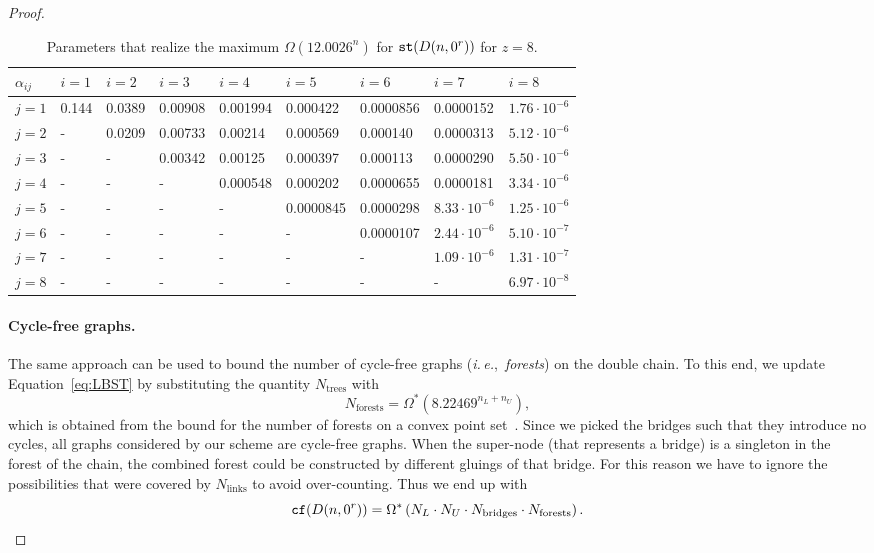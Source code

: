 \documentclass[11pt]{article}
\def\ie{{\it i.\,e.},~}
\def\st{{\tt st}}
\def\cf{{\tt cf}}
\begin{document}
\begin{proof}
\begin{table}
\centering
\begin{tabular}{l||llllllll}
 $\alpha_{ij}$ & $i=1$ & $i=2$ & $i=3$ & $i=4$ & $i=5$ & $i=6$ & $i=7$ & $i=8$ \\
  \hline
\hline
 $j=1$ & 0.144 & 0.0389 & 0.00908 & 0.001994 & 0.000422 & 0.0000856 & 0.0000152 & $1.76\cdot 10^{-6}$ \\
 $j=2$ & - & 0.0209 & 0.00733 & 0.00214 & 0.000569 & 0.000140 & 0.0000313 & $5.12\cdot 10^{-6} $\\
 $j=3$ & - & - & 0.00342& 0.00125 & 0.000397 & 0.000113 & 0.0000290 & $5.50\cdot 10^{-6}$ \\
 $j=4$ & - & - & - & 0.000548& 0.000202 & 0.0000655 & 0.0000181 & $3.34\cdot 10^{-6}$ \\
 $j=5$ & - & - & - & - & 0.0000845 & 0.0000298 & $8.33\cdot 10^{-6}$ & $1.25\cdot 10^{-6}$ \\
 $j=6$ & - & - & - & - & - & 0.0000107 & $2.44\cdot 10^{-6}$ & $5.10\cdot 10^{-7}$ \\
 $j=7$& - & - & - & - & - & - & $1.09\cdot 10^{-6}$ & $1.31\cdot 10^{-7}$ \\
 $j=8$ & - & - & - & - & - & - & - & $6.97\cdot 10^{-8}$
\end{tabular}
\caption{Parameters that realize the maximum
  $\Omega(12.0026^n)$ for
$\st(D(n,0^r))$ for $z=8$.}
\label{tab:z8}

\end{table}



\paragraph{Cycle-free graphs.}
The same approach can be used to bound the number of cycle-free
graphs (\ie {\em forests}) on the double chain. To this end, we update
Equation~\eqref{eq:LBST} by substituting the quantity $N_{\text{trees}}$ with
\[N_{\text{forests}}=\Omega^*\left(8.22469^{n_L+n_U}\right),\]
which is obtained from the bound for the number of forests on a convex
point set~\cite{FN99}. Since we picked the bridges such that they introduce no cycles,
all graphs considered by our scheme are cycle-free graphs. When the
super-node (that represents a bridge) is a singleton in the forest of
the chain, the combined forest could be constructed by different
gluings of that bridge. For this reason we have to ignore the
possibilities that were covered by $N_{\text{links}}$ to avoid
over-counting. Thus we end up with
\[
 \cf(D(n,0^r))=\Omega^*\left( N_L
\cdot N_U \cdot N_{\text{bridges}} \cdot
N_{\text{forests}} \right).
\]


\end{proof}
\end{document}
